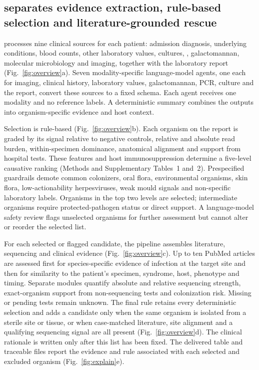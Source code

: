 
\subsection*{\toolname separates evidence extraction, rule-based selection and literature-grounded rescue}

\toolname processes nine clinical sources for each patient: admission diagnosis, underlying conditions, blood counts, other laboratory values, cultures, \filmarray, galactomannan, molecular microbiology and imaging, together with the laboratory \mngs report (Fig.~\ref{fig:overview}a). Seven modality-specific language-model agents, one each for imaging, clinical history, laboratory values, galactomannan, PCR, culture and the \mngs report, convert these sources to a fixed schema. Each agent receives one modality and no reference labels. A deterministic summary combines the outputs into organism-specific evidence and host context.

Selection is rule-based (Fig.~\ref{fig:overview}b). Each organism on the \mngs report is graded by its signal relative to negative controls, relative and absolute read burden, within-specimen dominance, anatomical alignment and support from hospital tests. These features and host immunosuppression determine a five-level causative ranking (Methods and Supplementary Tables~1 and~2). Prespecified guardrails demote common colonizers, oral flora, environmental organisms, skin flora, low-actionability herpesviruses, weak mould signals and non-specific laboratory labels. Organisms in the top two levels are selected; intermediate organisms require protected-pathogen status or direct support. A language-model safety review flags unselected organisms for further assessment but cannot alter or reorder the selected list.

For each selected or flagged candidate, the pipeline assembles literature, sequencing and clinical evidence (Fig.~\ref{fig:overview}c). Up to ten PubMed articles are assessed first for species-specific evidence of infection at the target site and then for similarity to the patient's specimen, syndrome, host, phenotype and timing. Separate modules quantify absolute and relative sequencing strength, exact-organism support from non-sequencing tests and colonization risk. Missing or pending tests remain unknown. The final rule retains every deterministic selection and adds a candidate only when the same organism is isolated from a sterile site or tissue, or when case-matched literature, site alignment and a qualifying sequencing signal are all present (Fig.~\ref{fig:overview}d). The clinical rationale is written only after this list has been fixed. The delivered table and traceable files report the evidence and rule associated with each selected and excluded organism (Fig.~\ref{fig:explain}e).

